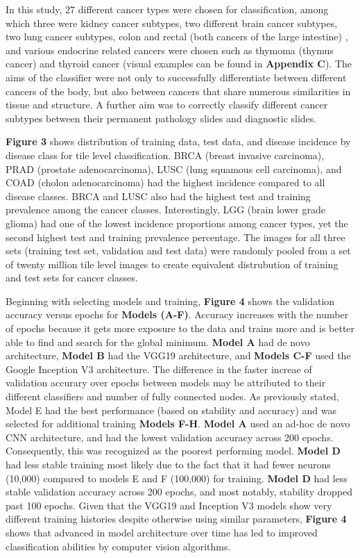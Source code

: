 \documentclass[12pt,]{article}
\begin{document}
In this study, 27 different cancer types were chosen for classification,
among which three were kidney cancer subtypes, two different brain
cancer subtypes, two lung cancer subtypes, colon and rectal (both
cancers of the large intestine) , and various endocrine related cancers
were chosen such as thymoma (thymus cancer) and thyroid cancer (visual
examples can be found in \textbf{Appendix C}). The aims of the
classifier were not only to successfully differentiate between different
cancers of the body, but also between cancers that share numerous
similarities in tissue and structure. A further aim was to correctly
classify different cancer subtypes between their permanent pathology
slides and diagnostic slides.

\textbf{Figure 3} shows distribution of training data, test data, and
disease incidence by disease class for tile level classification. BRCA
(breast invasive carcinoma), PRAD (prostate adenocarcinoma), LUSC (lung
squamous cell carcinoma), and COAD (cholon adenocarcinoma) had the
highest incidence compared to all disease classes. BRCA and LUSC also
had the highest test and training prevalence among the cancer classes.
Interestingly, LGG (brain lower grade glioma) had one of the lowest
incidence proportions among cancer types, yet the second highest test
and training prevalence percentage. The images for all three sets
(training test set, validation and test data) were randomly pooled from
a set of twenty million tile level images to create equivalent
distrubution of training and test sets for cancer classes.

Beginning with selecting models and training, \textbf{Figure 4} shows
the validation accuracy versus epochs for \textbf{Models (A-F)}.
Accuracy increases with the number of epochs because it gets more
exposure to the data and trains more and is better able to find and
search for the global minimum. \textbf{Model A} had de novo
architecture, \textbf{Model B} had the VGG19 architecture, and
\textbf{Models C-F} used the Google Inception V3 architecture. The
difference in the faster increae of validation accurary over epochs
between models may be attributed to their different classifiers and
number of fully connected nodes. As previously stated, Model E had the
best performance (based on stability and accuracy) and was selected for
additional training \textbf{Models F-H}. \textbf{Model A} used an ad-hoc
de novo CNN architecture, and had the lowest validation accuracy across
200 epochs. Consequently, this was recognized as the poorest performing
model. \textbf{Model D} had less stable training most likely due to the
fact that it had fewer neurons (10,000) compared to models E and F
(100,000) for training. \textbf{Model D} had less stable validation
accuracy across 200 epochs, and most notably, stability dropped past 100
epochs. Given that the VGG19 and Inception V3 models show very different
training histories despite otherwise using similar parameters,
\textbf{Figure 4} shows that advanced in model architecture over time
has led to improved classification abilities by computer vision
algorithms.
\end{document}
